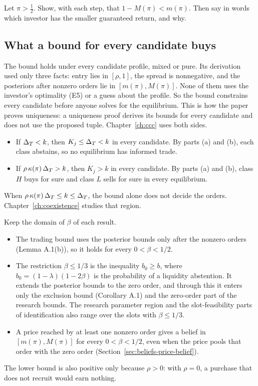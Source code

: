\begin{checkyourself}\label{q:trading-prior}
Let \(\pi>\tfrac12\). Show, with each step, that \(1-M(\pi)<m(\pi)\). Then say in words which investor has the
smaller guaranteed return, and why.
\end{checkyourself}

\subsection{What a bound for every candidate buys}

The bound holds under every candidate profile, mixed or pure. Its derivation used only three facts: entry lies in
\([\rho,1]\), the spread is nonnegative, and the posteriors after nonzero orders lie in \([m(\pi),M(\pi)]\). None of
them uses the investor's optimality (E5) or a guess about the profile. So the bound constrains every candidate
before anyone solves for the equilibrium. This is how the paper proves uniqueness: a uniqueness proof derives its
bounds for every candidate and does not use the proposed tuple. Chapter~\ref{ch:ccc} uses both sides.
\begin{itemize}
\item If \(\Delta_T<k\), then \(K_j\le\Delta_T<k\) in every candidate. By parts (a) and (b), each class abstains, so no
equilibrium has informed trade.
\item If \(\rho\,\kappa(\pi)\,\Delta_T>k\), then \(K_j>k\) in every candidate. By parts (a) and (b), class \(H\) buys for
sure and class \(L\) sells for sure in every equilibrium.
\end{itemize}
When \(\rho\,\kappa(\pi)\,\Delta_T\le k\le\Delta_T\), the bound alone does not decide the orders. Chapter~\ref{ch:coexistence}
studies that region.

\begin{watchout}
Keep the domain of \(\beta\) of each result.
\begin{itemize}
\item The trading bound uses the posterior bounds only after the nonzero orders (Lemma A.1(b)), so it holds for
every \(0<\beta<1/2\).
\item The restriction \(\beta\le1/3\) is the inequality \(b_0\ge b\), where \(b_0=(1-\lambda)(1-2\beta)\) is the
probability of a liquidity abstention. It extends the posterior bounds to the zero order, and through this it enters
only the exclusion bound (Corollary A.1) and the zero-order part of the research bounds. The research parameter
region and the slot-feasibility parts of identification also range over the slots with \(\beta\le1/3\).
\item A price reached by at least one nonzero order gives a belief in \([m(\pi),M(\pi)]\) for every
\(0<\beta<1/2\), even when the price pools that order with the zero order (Section~\ref{sec:beliefs-price-belief}).
\end{itemize}
The lower bound is also positive only because \(\rho>0\): with \(\rho=0\), a purchase that does not recruit would
earn nothing.
\end{watchout}

